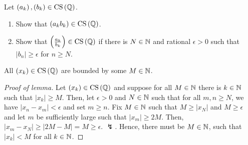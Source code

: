 \documentclass[a4paper]{article}
\begin{document}
\newpage
\begin{problem}[10]
	Let \(\left( a_{k} \right), \left( b_{k} \right) \in \operatorname{CS} \left( \mathbb{Q} \right) \).
	\begin{enumerate}
		\item Show that \(\left( a_{k}b_{k} \right) \in \operatorname{CS} \left( \mathbb{Q} \right)  \).
		\item Show that \(\left( \frac{a_{k}}{b_{k}} \right)  \in \operatorname{CS} \left( \mathbb{Q} \right) \) if there is \(N \in \mathbb{N}\) and rational \(\epsilon > 0\) such that \(\left| b_{n} \right|\ge \epsilon \) for \(n \ge N\).
	\end{enumerate}
\end{problem}
	\begin{lemma}
		All \(\left( x_{k} \right) \in \operatorname{CS} \left( \mathbb{Q} \right) \) are bounded by some \(M \in \mathbb{N}\).
	\end{lemma}
	\begin{proof}[Proof of lemma]
		Let \(\left( x_{k} \right) \in \operatorname{CS} \left( \mathbb{Q} \right) \) and suppose for all \(M \in \mathbb{N}\) there is \(k \in \mathbb{N}\) such that \(\left| x_{k} \right| \ge M\). Then, let \(\epsilon > 0\) and \(N \in \mathbb{N}\) such that for all \(m, n \ge N\), we have \(\left| x_{n} - x_{m} \right| < \epsilon\) and set \(m \ge n\). Fix \(M \in \mathbb{N}\) such that \(M \ge \left|x_{N}\right|\) and \(M \ge \epsilon\) and let \(m\) be sufficiently large such that \(\left| x_{m} \right| \ge 2M\). Then, \(\left| x_{m} - x_{N} \right| \ge \left| 2M - M \right|  = M \ge \epsilon\). \(\lightning\). Hence, there must be \(M \in \mathbb{N}\), such that  \(\left| x_{k} \right| < M\) for all \(k \in \mathbb{N}\).
	\end{proof}
\end{document}
